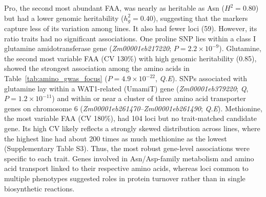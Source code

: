 Pro, the second most abundant FAA, was nearly as heritable as Asn ($H^2 = 0.80$) but had a lower genomic heritability ($h^2_g = 0.40$), suggesting that the markers capture less of its variation among lines. It also had fewer loci (59). However, its ratio traits had no significant associations. One proline SNP lies within a class I glutamine amidotransferase gene (\textit{Zm00001eb217220}; $P = 2.2 \times 10^{-9}$).
Glutamine, the second most variable FAA (CV 130\%) with high genomic heritability (0.85), showed the strongest association among the amino acids in Table~\ref{tab:amino_gwas_focus} ($P = 4.9 \times 10^{-22}$, \textit{Q.E}). SNPs associated with glutamine lay within a WAT1-related (UmamiT) gene (\textit{Zm00001eb379220}; \textit{Q}, $P = 1.2 \times 10^{-11}$) and within or near a cluster of three amino acid transporter genes on chromosome 6 (\textit{Zm00001eb261470}--\textit{Zm00001eb261490}; \textit{Q.E}). Methionine, the most variable FAA (CV 180\%), had 104 loci but no trait-matched candidate gene. Its high CV likely reflects a strongly skewed distribution across lines, where the highest line had about 200 times as much methionine as the lowest (Supplementary Table S3). Thus, the most robust gene-level associations were specific to each trait. Genes involved in Asn/Asp-family metabolism and amino acid transport linked to their respective amino acids, whereas loci common to multiple phenotypes suggested roles in protein turnover rather than in single biosynthetic reactions.


